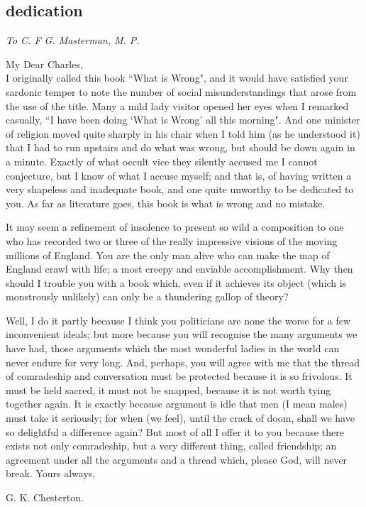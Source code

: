 \documentclass[final,10pt,letterpaper,twocolumn,openany]{book}
\begin{document}
\begin{titlepage}
\begin{multicols}{2}
\section{dedication}
\begin{flushright}
	\itshape To C. F G. Masterman, M. P.
\end{flushright}
My Dear Charles,\\ 
I originally called this book ``What is Wrong", and it would have
satisfied your sardonic temper to note the number of social
misunderstandings that arose from the use of the title. Many a mild lady
visitor opened her eyes when I remarked casually, ``I have been doing
`What is Wrong' all this morning". And one minister of religion moved
quite sharply in his chair when I told him (as he understood it) that I had to
run upstairs and do what was wrong, but should be down again in a minute.
Exactly of what occult vice they silently accused me I cannot conjecture,
but I know of what I accuse myself; and that is, of having written a very
shapeless and inadequate book, and one quite unworthy to be dedicated to
you. As far as literature goes, this book is what is wrong and no mistake.

It may seem a refinement of insolence to present so wild a
composition to one who has recorded two or three of the really impressive
visions of the moving millions of England. You are the only man alive
who can make the map of England crawl with life; a most creepy and
enviable accomplishment. Why then should I trouble you with a book
which, even if it achieves its object (which is monstrously unlikely) can
only be a thundering gallop of theory?

Well, I do it partly because I think you politicians are none the worse
for a few inconvenient ideals; but more because you will recognise the
many arguments we have had, those arguments which the most wonderful
ladies in the world can never endure for very long. And, perhaps, you will
agree with me that the thread of comradeship and conversation must be
protected because it is so frivolous. It must be held sacred, it must not be
snapped, because it is not worth tying together again. It is exactly because
argument is idle that men (I mean males) must take it seriously; for when
(we feel), until the crack of doom, shall we have so delightful a difference
again? But most of all I offer it to you because there exists not only
comradeship, but a very different thing, called friendship; an agreement
under all the arguments and a thread which, please God, will never break. Yours always,
\begin{flushright}
	G. K. Chesterton.
\end{flushright}
\end{multicols}
\end{titlepage}
\end{document}
